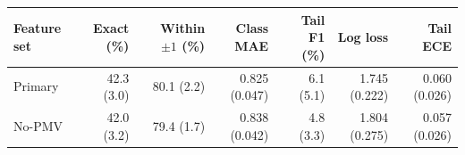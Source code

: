 \begin{tabular}{lrrrrrr}
\toprule
Feature set & Exact (\%) & Within $\pm1$ (\%) & Class MAE & Tail F1 (\%) & Log loss & Tail ECE \\
\midrule
Primary & 42.3 (3.0) & 80.1 (2.2) & 0.825 (0.047) & 6.1 (5.1) & 1.745 (0.222) & 0.060 (0.026) \\
No-PMV & 42.0 (3.2) & 79.4 (1.7) & 0.838 (0.042) & 4.8 (3.3) & 1.804 (0.275) & 0.057 (0.026) \\
\bottomrule
\end{tabular}
